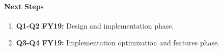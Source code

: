 
\paragraph{Next Steps}

\begin{enumerate}
\item
\textbf{Q1-Q2 FY19:}
Design and implementation phase.
\item
\textbf{Q3-Q4 FY19:}
Implementation optimization and features phase.
\end{enumerate}
